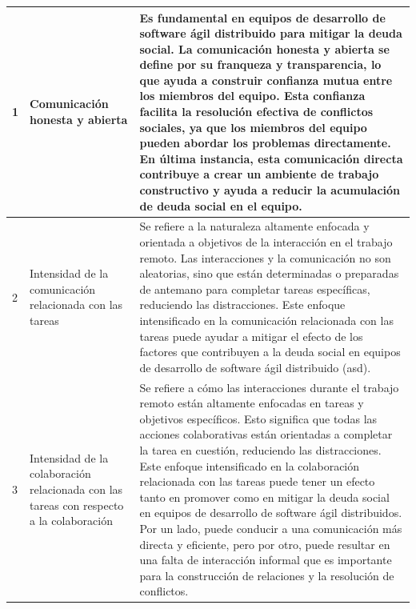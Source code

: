 \begin{longtable}{|
    >{\Centering\hspace{0pt}}p{0.7cm}|
    >{\RaggedRight\hspace{0pt}}p{4.0cm}|
    >{\RaggedRight\hspace{0pt}}p{10.5cm}|
    }
    1                                                                                       &
    Comunicación honesta y abierta                                                          &
    Es fundamental en equipos de desarrollo de software ágil distribuido para mitigar la deuda social. La comunicación honesta y abierta se define por su franqueza y transparencia, lo que ayuda a construir confianza mutua entre los miembros del equipo. Esta confianza facilita la resolución efectiva de conflictos sociales, ya que los miembros del equipo pueden abordar los problemas directamente. En última instancia, esta comunicación directa contribuye a crear un ambiente de trabajo constructivo y ayuda a reducir la acumulación de deuda social en el equipo.                                                                                                                          \\

    \hline

    2                                                                                       &
    Intensidad de la comunicación relacionada con las tareas                                &
    Se refiere a la naturaleza altamente enfocada y orientada a objetivos de la interacción en el trabajo remoto. Las interacciones y la comunicación no son aleatorias, sino que están determinadas o preparadas de antemano para completar tareas específicas, reduciendo las distracciones. Este enfoque intensificado en la comunicación relacionada con las tareas puede ayudar a mitigar el efecto de los factores que contribuyen a la deuda social en equipos de desarrollo de software ágil distribuido (\gls{asd}).                                                                                                                                                                               \\

    \hline

    3                                                                                       &
    Intensidad de la colaboración relacionada con las tareas con respecto a la colaboración &
    Se refiere a cómo las interacciones durante el trabajo remoto están altamente enfocadas en tareas y objetivos específicos. Esto significa que todas las acciones colaborativas están orientadas a completar la tarea en cuestión, reduciendo las distracciones. Este enfoque intensificado en la colaboración relacionada con las tareas puede tener un efecto tanto en promover como en mitigar la deuda social en equipos de desarrollo de software ágil distribuidos. Por un lado, puede conducir a una comunicación más directa y eficiente, pero por otro, puede resultar en una falta de interacción informal que es importante para la construcción de relaciones y la resolución de conflictos. \\


\end{longtable}
